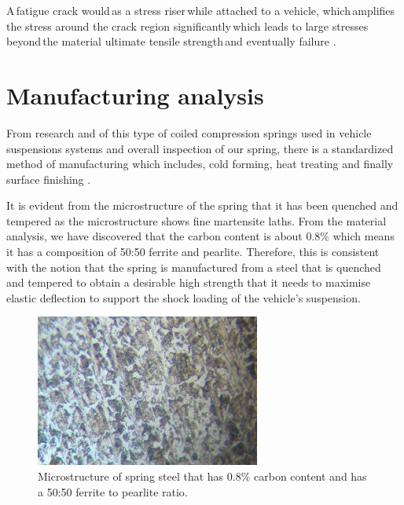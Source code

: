 \documentclass[11pt]{article}
\begin{document}
A fatigue crack would as a stress riser while attached to a vehicle, which amplifies the stress around the crack region significantly which leads to large stresses beyond the material ultimate tensile strength and eventually failure \cite{b2}.
\newpage
\section{Manufacturing analysis}
From research and of this type of coiled compression springs used in vehicle suspensions systems and overall inspection of our spring, there is a standardized method of manufacturing which includes, cold forming, heat treating and finally surface finishing \cite{b3}.

It is evident from the microstructure of the spring that it has been quenched and tempered as the microstructure shows fine martensite laths. From the material analysis, we have discovered that the carbon content is about 0.8\% which means it has a composition of 50:50 ferrite and pearlite. Therefore, this is consistent with the notion that the spring is manufactured from a steel that is quenched and tempered to obtain a desirable high strength that it needs to maximise elastic deflection to support the shock loading of the vehicle’s suspension.
\begin{figure}[H]
    \centering
    \includegraphics[height = 5cm]{./img/microstructure1.jpeg}
    \caption{Microstructure of spring steel that has 0.8\% carbon content and has a 50:50 ferrite to pearlite ratio.}
    \label{fig:microstructure1}
\end{figure}
\end{document}
